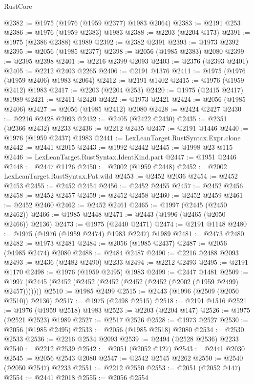 \begin{lexlean}{RustCore}
\begin{coremodule}
@2382 := @1975 (@1976 (@1959 @2377) @1983 @2064)
@2383 := @2191 @253
@2386 := @1976 (@1959 @2383) @1983
@2388 := @2203 (@2204 @173)
@2391 := @1975 (@2386 @2388) @1989
@2392 := @2382 @2391
@2393 := @1973 @2392
@2395 := @2056 (@1985 @2377)
@2398 := @2056 (@1985 @2383) @2080
@2399 := @2395 @2398
@2401 := @2216 @2399 @2093
@2403 := @2376 (@2393 @2401)
@2405 := @2212 @2403 @2265
@2406 := @2191 @1376
@2411 := @1975 (@1976 (@1959 @2406) @1983 @2064)
@2412 := @2191 @1402
@2415 := @1976 (@1959 @2412) @1983
@2417 := @2203 (@2204 @253)
@2420 := @1975 (@2415 @2417) @1989
@2421 := @2411 @2420
@2422 := @1973 @2421
@2424 := @2056 (@1985 @2406)
@2427 := @2056 (@1985 @2412) @2080
@2428 := @2424 @2427
@2430 := @2216 @2428 @2093
@2432 := @2405 (@2422 @2430)
@2435 := @2351 (@2366 @2432) @2233
@2436 := @2212 @2435
@2437 := @2191 @1446
@2440 := @1976 (@1959 @2437) @1983
@2441 := LexLeanTarget.RustSyntax.Expr.clone
@2442 := @2441 @2015
@2443 := @1992 @2442
@2445 := @1998 @23 @115
@2446 := LexLeanTarget.RustSyntax.IdentKind.part
@2447 := @1951 @2446
@2448 := @2447 @1126
@2450 := @2002 (@1959 @2448)
@2452 := @2002 LexLeanTarget.RustSyntax.Pat.wild
@2453 := @2452 @2036
@2454 := @2452 @2453
@2455 := @2452 @2454
@2456 := @2452 @2455
@2457 := @2452 @2456
@2458 := @2452 @2457
@2459 := @2452 @2458
@2460 := @2452 @2459
@2461 := @2452 @2460
@2462 := @2452 @2461
@2465 := @1997 (@2445 (@2450 @2462))
@2466 := @1985 @2448
@2471 := @2443 (@1996 (@2465 (@2050 @2466)) @2136)
@2473 := @1975 (@2440 @2471)
@2474 := @2191 @1148
@2480 := @1975 (@1976 (@1959 @2474) @1983 @2247) @1989
@2481 := @2473 @2480
@2482 := @1973 @2481
@2484 := @2056 (@1985 @2437)
@2487 := @2056 (@1985 @2474) @2080
@2488 := @2484 @2487
@2490 := @2216 @2488 @2093
@2493 := @2436 (@2482 @2490) @2233
@2494 := @2212 @2493
@2495 := @2191 @1170
@2498 := @1976 (@1959 @2495) @1983
@2499 := @2447 @1481
@2509 := @1997 (@2445 (@2452 (@2452 (@2452 (@2452 (@2452 (@2002 (@1959 @2499) @2457)))))))
@2510 := @1985 @2499
@2515 := @2443 (@1996 (@2509 (@2050 @2510)) @2136)
@2517 := @1975 (@2498 @2515)
@2518 := @2191 @1516
@2521 := @1976 (@1959 @2518) @1983
@2523 := @2203 (@2204 @147)
@2526 := @1975 (@2521 @2523) @1989
@2527 := @2517 @2526
@2528 := @1973 @2527
@2530 := @2056 (@1985 @2495)
@2533 := @2056 (@1985 @2518) @2080
@2534 := @2530 @2533
@2536 := @2216 @2534 @2093
@2539 := @2494 (@2528 @2536) @2233
@2540 := @2212 @2539
@2542 := @2051 (@2052 @127)
@2543 := @2441 @2030
@2545 := @2056 @2543 @2080
@2547 := @2542 @2545 @2262
@2550 := @2540 (@2050 @2547) @2233
@2551 := @2212 @2550
@2553 := @2051 (@2052 @147)
@2554 := @2441 @2018
@2555 := @2056 @2554

\end{coremodule}
\end{lexlean}
